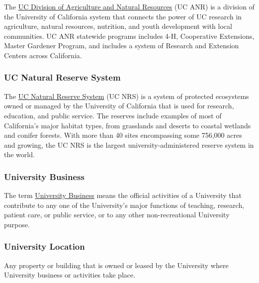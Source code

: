 \documentclass[
]{book}
\begin{document}
The \protect\hyperlink{ANR}{UC Division of Agriculture and Natural Resources} (UC ANR) is a division of the University of California system that connects the power of UC research in agriculture, natural resources, nutrition, and youth development with local communities. UC ANR statewide programs includes 4-H, Cooperative Extensions, Master Gardener Program, and includes a system of Research and Extension Centers across California.



\hypertarget{NRS}{%
\subsubsection*{UC Natural Reserve System}\label{NRS}}

The \protect\hyperlink{NRS}{UC Natural Reserve System} (UC NRS) is a system of protected ecosystems owned or managed by the University of California that is used for research, education, and public service. The reserves include examples of most of California's major habitat types, from grasslands and deserts to coastal wetlands and conifer forests. With more than 40 sites encompassing some 756,000 acres and growing, the UC NRS is the largest university-administered reserve system in the world.



\hypertarget{UB}{%
\subsubsection*{University Business}\label{UB}}

The term \protect\hyperlink{UB}{University Business} means the official activities of a University that contribute to any one of the University's major functions of teaching, research, patient care, or public service, or to any other non-recreational University purpose.



\hypertarget{UL}{%
\subsubsection*{University Location}\label{UL}}

Any property or building that is owned or leased by the University where University business or activities take place.
\end{document}
